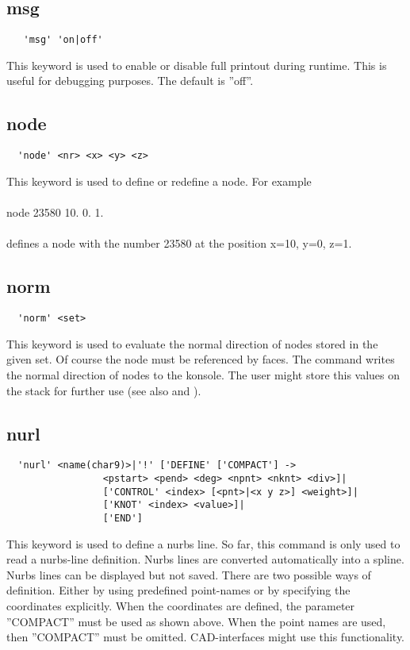 \documentclass{article}
\begin{document}
\subsection{\label{msg}msg}
\begin{verbatim}
   'msg' 'on|off' 
\end{verbatim}
This keyword is used to enable or disable full printout during runtime. This is useful for debugging purposes. The default is ''off''.

\subsection{\label{node}node}
\begin{verbatim}
  'node' <nr> <x> <y> <z> 
\end{verbatim}
This keyword is used to define or redefine a node. For example\\\\node 23580 10. 0. 1.\\\\defines a node with the number 23580 at the position x=10, y=0, z=1.

\subsection{\label{norm}norm}
\begin{verbatim}
  'norm' <set> 
\end{verbatim}
This keyword is used to evaluate the normal direction of nodes stored in the given set. Of course the node must be referenced by faces. The command writes the normal direction of nodes to the konsole. The user might store this values on the stack for further use (see also  and ). 

\subsection{\label{nurl}nurl}
\begin{verbatim}
  'nurl' <name(char9)>|'!' ['DEFINE' ['COMPACT'] ->
                 <pstart> <pend> <deg> <npnt> <nknt> <div>]|
                 ['CONTROL' <index> [<pnt>|<x y z>] <weight>]|
                 ['KNOT' <index> <value>]|
                 ['END']
\end{verbatim}
This keyword is used to define a nurbs line. So far, this command is only used to read a nurbs-line definition. Nurbs lines are converted automatically into a spline. Nurbs lines can be displayed but not saved. There are two possible ways of definition. Either by using predefined point-names or by specifying the coordinates explicitly. When the coordinates are defined, the parameter ''COMPACT'' must be used as shown above. When the point names are used, then ''COMPACT'' must be omitted. CAD-interfaces might use this functionality.
\end{document}
